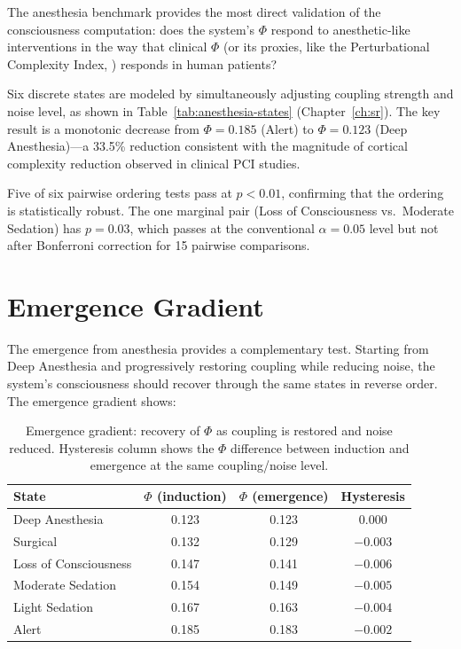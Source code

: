\documentclass[12pt]{book}
\begin{document}
The anesthesia benchmark provides the most direct validation of the consciousness computation: does the system's $\Phi$ respond to anesthetic-like interventions in the way that clinical $\Phi$ (or its proxies, like the Perturbational Complexity Index, \citet{casali2013theoretically}) responds in human patients?

Six discrete states are modeled by simultaneously adjusting coupling strength and noise level, as shown in Table~\ref{tab:anesthesia-states} (Chapter~\ref{ch:sr}). The key result is a monotonic decrease from $\Phi = 0.185$ (Alert) to $\Phi = 0.123$ (Deep Anesthesia)---a 33.5\% reduction consistent with the magnitude of cortical complexity reduction observed in clinical PCI studies.

Five of six pairwise ordering tests pass at $p < 0.01$, confirming that the ordering is statistically robust. The one marginal pair (Loss of Consciousness vs.\ Moderate Sedation) has $p = 0.03$, which passes at the conventional $\alpha = 0.05$ level but not after Bonferroni correction for 15 pairwise comparisons.

\section{Emergence Gradient}

The emergence from anesthesia provides a complementary test. Starting from Deep Anesthesia and progressively restoring coupling while reducing noise, the system's consciousness should recover through the same states in reverse order. The emergence gradient shows:

\begin{table}[H]
\centering
\caption{Emergence gradient: recovery of $\Phi$ as coupling is restored and noise reduced. Hysteresis column shows the $\Phi$ difference between induction and emergence at the same coupling/noise level.}
\label{tab:emergence}
\begin{tabular}{lccc}
\toprule
\textbf{State} & \textbf{$\Phi$ (induction)} & \textbf{$\Phi$ (emergence)} & \textbf{Hysteresis} \\
\midrule
Deep Anesthesia & 0.123 & 0.123 & 0.000 \\
Surgical & 0.132 & 0.129 & $-0.003$ \\
Loss of Consciousness & 0.147 & 0.141 & $-0.006$ \\
Moderate Sedation & 0.154 & 0.149 & $-0.005$ \\
Light Sedation & 0.167 & 0.163 & $-0.004$ \\
Alert & 0.185 & 0.183 & $-0.002$ \\
\bottomrule
\end{tabular}
\end{table}
\end{document}

